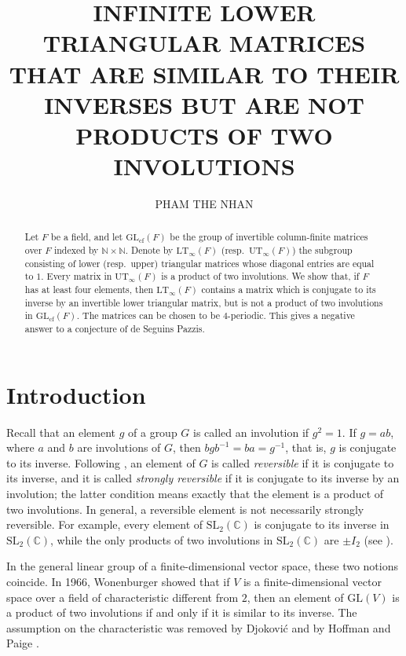 \documentclass[11pt,reqno,a4paper]{amsart}
\title[LOWER TRIANGULAR MATRICES AND PRODUCTS OF TWO INVOLUTIONS]{INFINITE LOWER TRIANGULAR MATRICES THAT ARE SIMILAR TO THEIR INVERSES BUT ARE NOT PRODUCTS OF TWO INVOLUTIONS}
\author[PHAM THE NHAN]{PHAM THE NHAN}
\numberwithin{equation}{section}
\theoremstyle{definition}
\theoremstyle{plain}
\newcommand{\cf}{\mathrm{cf}}
\newcommand{\GL}{\mathrm{GL}}
\newcommand{\LT}{\mathrm{LT}_{\infty}}
\newcommand{\UT}{\mathrm{UT}_{\infty}}
\newcommand{\bbN}{\mathbb N}
\newcommand{\bbC}{\mathbb C}
\begin{document}
\raggedbottom
\begin{abstract}
Let $F$ be a field, and let $\GL_{\cf}(F)$ be the group of invertible column-finite matrices over $F$ indexed by $\bbN\times\bbN$. Denote by $\LT(F)$ (resp.\ $\UT(F)$) the subgroup consisting of lower (resp.\ upper) triangular matrices whose diagonal entries are equal to $1$. Every matrix in $\UT(F)$ is a product of two involutions. We show that, if $F$ has at least four elements, then $\LT(F)$ contains a matrix which is conjugate to its inverse by an invertible lower triangular matrix, but is not a product of two involutions in $\GL_{\cf}(F)$. The matrices can be chosen to be $4$-periodic. This gives a negative answer to a conjecture of de Seguins Pazzis.
\end{abstract}
\maketitle

\section{Introduction}
Recall that an element $g$ of a group $G$ is called an involution if $g^2=1$. If $g=ab$, where $a$ and $b$ are involutions of $G$, then $bgb^{-1}=ba=g^{-1}$, that is, $g$ is conjugate to its inverse. Following \cite{ofarrell2015}, an element of $G$ is called \emph{reversible} if it is conjugate to its inverse, and it is called \emph{strongly reversible} if it is conjugate to its inverse by an involution; the latter condition means exactly that the element is a product of two involutions. In general, a reversible element is not necessarily strongly reversible. For example, every element of $\mathrm{SL}_2(\bbC)$ is conjugate to its inverse in $\mathrm{SL}_2(\bbC)$, while the only products of two involutions in $\mathrm{SL}_2(\bbC)$ are $\pm I_2$ (see \cite{pazzis2024}).

In the general linear group of a finite-dimensional vector space, these two notions coincide. In 1966, Wonenburger \cite{wonenburger1966} showed that if $V$ is a finite-dimensional vector space over a field of characteristic different from $2$, then an element of $\GL(V)$ is a product of two involutions if and only if it is similar to its inverse. The assumption on the characteristic was removed by Djokovi\'{c} \cite{djokovic1967} and by Hoffman and Paige \cite{hoffman1971}.
\end{document}
